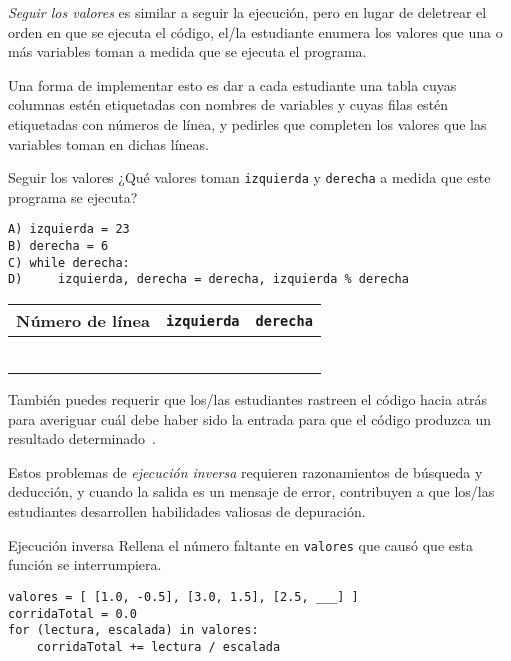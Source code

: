 \emph{Seguir los valores} es similar a seguir la ejecución, 
pero en lugar de deletrear el orden en que se ejecuta el código, 
el/la estudiante enumera los valores que una o más variables toman
 a medida que se ejecuta el programa.

Una forma de implementar esto es dar a cada estudiante una tabla 
cuyas columnas estén etiquetadas con nombres de variables 
y cuyas filas estén etiquetadas con números de línea, 
y pedirles que completen los valores que las variables toman en dichas líneas.

\newpage
\begin{aside}{Seguir los valores}
  ¿Qué valores toman \texttt{izquierda} y \texttt{derecha} a medida que este programa se ejecuta?

\begin{verbatim}
A) izquierda = 23
B) derecha = 6
C) while derecha:
D)     izquierda, derecha = derecha, izquierda % derecha
\end{verbatim}
\end{aside}

\begin{center}
\begin{tabular}{|l|l|l|}
  \hline
  Número de línea & \texttt{izquierda} & \texttt{derecha} \\
  \hline
  & & \\
  \hline
  & & \\
  \hline
  & & \\
  \hline
  & & \\
  \hline
  & & \\
  \hline
  & & \\
  \hline
\end{tabular}
\end{center}

También puedes requerir que  los/las estudiantes rastreen el código hacia atrás para averiguar cuál debe haber sido la entrada para que el código produzca un resultado determinado~\cite{Armo2008}.


Estos problemas de  \emph{ejecución inversa} requieren razonamientos de búsqueda y deducción, 
y cuando la salida es un mensaje de error, 
contribuyen a que los/las estudiantes desarrollen habilidades valiosas de depuración.

\begin{aside}{Ejecución inversa}
  Rellena el número faltante en \texttt{valores}
  que causó que esta función se interrumpiera.

\begin{verbatim}
valores = [ [1.0, -0.5], [3.0, 1.5], [2.5, ___] ]
corridaTotal = 0.0
for (lectura, escalada) in valores:
    corridaTotal += lectura / escalada
\end{verbatim}
\end{aside}


